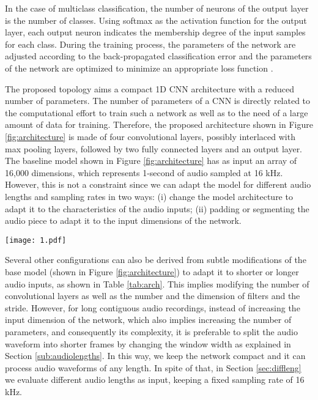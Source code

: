 \documentclass[preprint,final,12pt]{elsarticle}
\begin{document}
In the case of multiclass classification, the number of neurons of the output layer is the number of classes. Using softmax as the activation function for the output layer, each output neuron indicates the membership degree of the input samples for each class. During the training process, the parameters of the network are adjusted according to the back-propagated classification error and the parameters of the network are optimized to minimize an appropriate loss function \citep{Goodfellow-et-al-2016}.

The proposed topology aims a compact 1D CNN architecture with a reduced number of parameters. The number of parameters of a CNN is directly related to the computational effort to train such a network as well as to the need of a large amount of data for training. Therefore, the proposed architecture shown in Figure \ref{fig:architecture} is made of four convolutional layers, possibly interlaced with max pooling layers, followed by two fully connected layers and an output layer. The baseline model shown in Figure \ref{fig:architecture} has as input an array of 16,000 dimensions, which represents 1-second of audio sampled at 16 kHz. However, this is not a constraint since we can adapt the model for different audio lengths and sampling rates in two ways: (i) change the model architecture to adapt it to the characteristics of the audio inputs; (ii) padding or segmenting the audio piece to adapt it to the input dimensions of the network.

\begin{figure*}[htpb!]
  \centering
  \texttt{[image: 1.pdf]}
  \caption{The architecture of the proposed end-to-end 1D CNN for environmental sound classification. The dimension, number of filters and filter size are given for the input size of 16,000. For other input sizes, the values are presented in Table \ref{tab:arch}.}
  \label{fig:architecture}
\end{figure*}


Several other configurations can also be derived from subtle modifications of the base model (shown in Figure \ref{fig:architecture}) to adapt it to shorter or longer audio inputs, as shown in Table \ref{tab:arch}. This implies modifying the number of convolutional layers as well as the number and the dimension of filters and the stride. However, for long contiguous audio recordings, instead of increasing the input dimension of the network, which also implies increasing the number of parameters, and consequently its complexity, it is preferable to split the audio waveform into shorter frames by changing the window width as explained in Section \ref{sub:audiolengths}. In this way, we keep the network compact and it can process audio waveforms of any length. In spite of that, in Section \ref{sec:diffleng} we evaluate different audio lengths as input, keeping a fixed sampling rate of 16 kHz.
\end{document}
